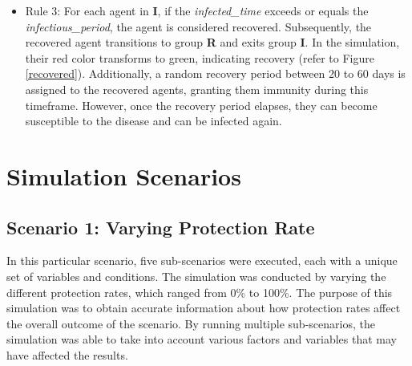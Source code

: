  \begin{itemize}
 	\item Rule 3: For each agent in \textbf{I}, if the \textit{infected\_time} exceeds or equals the \textit{infectious\_period}, the agent is considered recovered. Subsequently, the recovered agent transitions to group \textbf{R} and exits group \textbf{I}. In the simulation, their red color transforms to green, indicating recovery (refer to Figure \ref{recovered}). Additionally, a random recovery period between 20 to 60 days is assigned to the recovered agents, granting them immunity during this timeframe. However, once the recovery period elapses, they can become susceptible to the disease and can be infected again.
 \end{itemize}

 \section{ Simulation Scenarios}
 
 

 \subsection{ Scenario 1: Varying Protection Rate}
In this particular scenario, five sub-scenarios were executed, each with a unique set of variables and conditions. The simulation was conducted by varying the different protection rates, which ranged from 0\% to 100\%. The purpose of this simulation was to obtain accurate information about how protection rates affect the overall outcome of the scenario. By running multiple sub-scenarios, the simulation was able to take into account various factors and variables that may have affected the results. 


